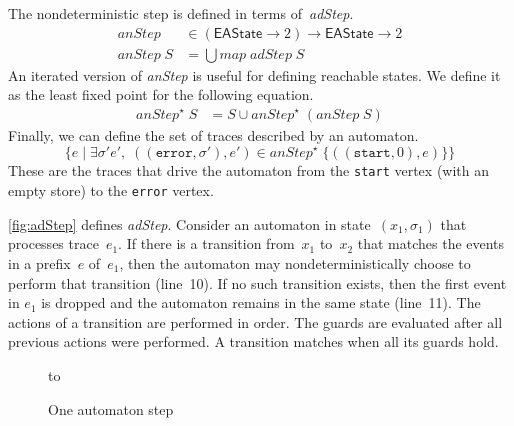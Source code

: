 \documentclass[preprint]{sigplanconf} %
\newcommand{\set}[1]{\ensuremath{\mathsf{#1}}}
\theoremstyle{definition}
\theoremstyle{remark}
\begin{document}
The nondeterministic step is defined in terms of~\textit{adStep}.
\begin{align}
\mathit{anStep}&\in(\set{EAState}\to2)\to\set{EAState}\to2\\
\mathit{anStep}\;S&=\bigcup \mathit{map}\;\mathit{adStep}\;S \label{eq:anstep}
\end{align}
An iterated version of \textit{anStep} is useful for defining reachable states.
We define it as the least fixed point for the following equation.
\begin{align}
\mathit{anStep}^\star\;S &= S \cup \mathit{anStep}^\star\;(\mathit{anStep}\;S)
\end{align}
Finally, we can define the set of traces described by an automaton.
\[ \{ e \mid \exists\sigma'e',\;((\mathtt{error},\sigma'),e')\in\mathit{anStep}^\star\;\{((\mathtt{start},0),e)\}\} \]
These are the traces that drive the automaton from the \texttt{start} vertex (with an empty store) to the \texttt{error} vertex.

\autoref{fig:adStep} defines \textit{adStep}.
Consider an automaton in state~$(x_1,\sigma_1)$ that processes trace~$e_1$.
If there is a transition from~$x_1$ to~$x_2$ that matches the events in a prefix~$e$ of~$e_1$, then the automaton may nondeterministically choose to perform that transition (line~10).
If no such transition exists, then the first event in $e_1$ is dropped and the automaton remains in the same state (line~11).
The actions of a transition are performed in order.
The guards are evaluated after all previous actions were performed.
A transition matches when all its guards hold.

\begin{figure}
\hbox to
\caption{One automaton step}
\label{fig:adStep}
\end{figure}
\end{document}
